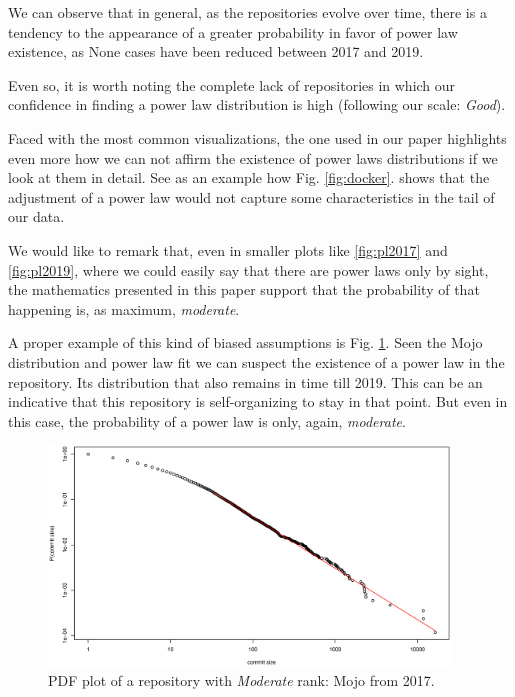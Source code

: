 \documentclass[conference]{IEEEtran}
\begin{document}
We can observe that in general, as the repositories evolve over time, there is a tendency to the appearance of a greater probability in favor of power law existence, as None cases have been reduced between 2017 and 2019.

Even so, it is worth noting the complete lack of repositories in which our confidence in finding a power law distribution is high (following our scale: \textit{Good}).

Faced with the most common visualizations, the one used in our paper highlights even more how we can not affirm the existence of power laws distributions if we look at them in detail. See as an example how Fig. \ref{fig:docker}. shows that the adjustment of a power law would not capture some characteristics in the tail of our data. 

We would like to remark that, even in smaller plots like \ref{fig:pl2017} and \ref{fig:pl2019}, where we could easily say that there are power laws only by sight, the mathematics presented in this paper support that the probability of that happening is, as maximum, \textit{ moderate}.

A proper example of this kind of biased assumptions is Fig. \ref{fig:mojo}. Seen the Mojo distribution and power law fit we can suspect the existence of a power law in the repository. Its distribution that also remains in time till 2019. This can be an indicative that this repository is self-organizing to stay in that point. But even in this case, the probability of a power law is only, again, \textit{moderate}.

\begin{figure}[htbp]
	\centerline{\includegraphics[width=0.95\textwidth]{plots/mojo-2017.eps}}
	\caption{PDF plot of a repository with \textit{Moderate} rank: Mojo from 2017.}
	\label{fig:mojo}
\end{figure}
\end{document}
